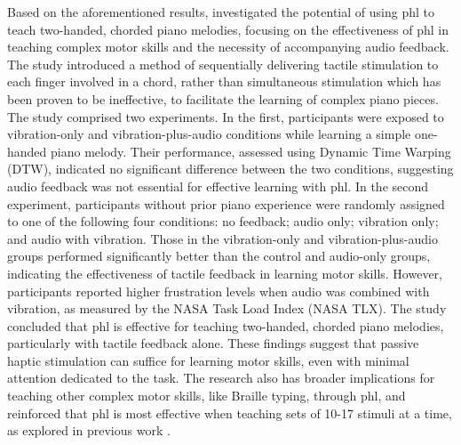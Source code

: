 Based on the aforementioned results, \cite{Seim2015b} investigated the potential of using \gls{phl} to teach two-handed, chorded piano melodies, focusing on the effectiveness of \gls{phl} in teaching complex motor skills and the necessity of accompanying audio feedback. The study introduced a method of sequentially delivering tactile stimulation to each finger involved in a chord, rather than simultaneous stimulation which has been proven to be ineffective, to facilitate the learning of complex piano pieces\cite{Luzhnica2017, Luzhnica2016, Luzhnica2018, Luzhnica2018a, Seim2014a}.
The study comprised two experiments. In the first, participants were exposed to vibration-only and vibration-plus-audio conditions while learning a simple one-handed piano melody. Their performance, assessed using Dynamic Time Warping (DTW), indicated no significant difference between the two conditions, suggesting audio feedback was not essential for effective learning with \gls{phl}.
In the second experiment, participants without prior piano experience were randomly assigned to one of the following four conditions: no feedback; audio only; vibration only; and audio with vibration. Those in the vibration-only and vibration-plus-audio groups performed significantly better than the control and audio-only groups, indicating the effectiveness of tactile feedback in learning motor skills. However, participants reported higher frustration levels when audio was combined with vibration, as measured by the NASA Task Load Index (NASA TLX).
The study concluded that \gls{phl} is effective for teaching two-handed, chorded piano melodies, particularly with tactile feedback alone. These findings suggest that passive haptic stimulation can suffice for learning motor skills, even with minimal attention dedicated to the task. The research also has broader implications for teaching other complex motor skills, like Braille typing, through \gls{phl}, and reinforced that \gls{phl} is most effective when teaching sets of 10-17 stimuli at a time, as explored in previous work \cite{Seim2014a}.

